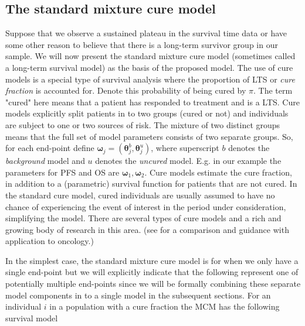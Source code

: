 \documentclass[AMA,STIX1COL]{WileyNJD-v2}
\begin{document}
\subsection{The standard mixture cure model} \label{section:basic_model}
Suppose that we observe a sustained plateau in the survival time data or have some other reason to believe that there is a long-term survivor group in our sample. We will now present the standard mixture cure model (sometimes called a long-term survival model) as the basis of the proposed model.
The use of cure models is a special type of survival analysis where the proportion of LTS or {\it cure fraction} is accounted for.
Denote this probability of being cured by $\pi$.
The term "cured" here means that a patient has responded to treatment and is a LTS.
Cure models explicitly split patients in to two groups (cured or not) and individuals are subject to one or two sources of risk.
The mixture of two distinct groups means that the full set of model parameters consists of two separate groups.
So, for each end-point define $\bm\omega_j = (\bm\theta^b_j, \bm\theta^u_j)$, where superscript $b$ denotes the \textit{background} model and $u$ denotes the \textit{uncured} model.
E.g. in our example the parameters for PFS and OS are $\bm\omega_1, \bm\omega_2$.
Cure models estimate the cure fraction, in addition to a (parametric) survival function for patients that are not cured.
In the standard cure model, cured individuals are usually assumed to have no chance of experiencing the event of interest in the period under consideration, simplifying the model.
There are several types of cure models and a rich and growing body of research in this area.
(see \citep{Yu2013} for a comparison and guidance with application to oncology.)


In the simplest case, the standard mixture cure model is for when we only have a single end-point but we will explicitly indicate that the following represent one of potentially multiple end-points since we will be formally combining these separate model components in to a single model in the subsequent sections.  
For an individual $i$ in a population with a cure fraction the MCM has the following survival model
\end{document}
